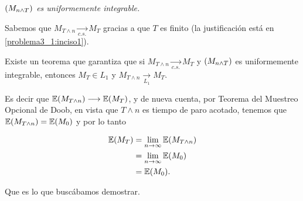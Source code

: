 \emph{
    $\left( M_{n\wedge T}\right) $ es uniformemente integrable. 
}

Sabemos que $M_{T \wedge n} \underset{c.s.}\longrightarrow M_T$ gracias a que $T$ es finito 
(la justificación está en \ref{problema3_1:inciso1}).\pn

Existe un teorema que garantiza que si $M_{T \wedge n} \underset{c.s.}\longrightarrow M_T$ y 
$\left( M_{n\wedge T}\right) $ es uniformemente integrable, entonces 
$M_T \in L_1$ y $M_{T \wedge n} \underset{L_1}\longrightarrow M_T$.\pn

Es decir que $\mathbb{E}(M_{T \wedge n}) \longrightarrow \mathbb{E}(M_T)$, y de nueva cuenta, por Teorema del Muestreo Opcional de Doob, 
en vista que $T \wedge n$ es tiempo de paro acotado, tenemos que $\mathbb{E}(M_{T \wedge n}) = \mathbb{E}(M_0)$ y por lo tanto

\begin{align}
    \mathbb{E}(M_T)     &=  \lim_{n \rightarrow \infty} \mathbb{E}(M_{T \wedge n})      \\
                &=  \lim_{n \rightarrow \infty} \mathbb{E}(M_0)                 \\
                &=  \mathbb{E}(M_0).
\end{align}\pn

Que es lo que buscábamos demostrar.
